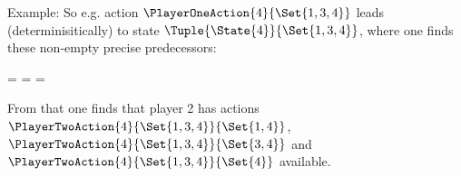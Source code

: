     Example: %
    So e.g. action $\PlayerOneAction{4}{\Set{1, 3, 4}}$ leads (determinisitically) to state $\Tuple{\State{4}}{\Set{1, 3, 4}}$, where one finds these non-empty precise predecessors:

    \startformula
        \startalign[n=2,align={left,left}]
            \NC {}
            \NC = 
            \NR
            \NC {}
            \NC = 
            \NR
            \NC {}
            \NC = 
            \NR
        \stopalign
    \stopformula

    From that one finds that player 2 has actions $\PlayerTwoAction{4}{\Set{1, 3, 4}}{\Set{1, 4}}$, $\PlayerTwoAction{4}{\Set{1, 3, 4}}{\Set{3, 4}}$ and $\PlayerTwoAction{4}{\Set{1, 3, 4}}{\Set{4}}$ available.

\stopsubsection


